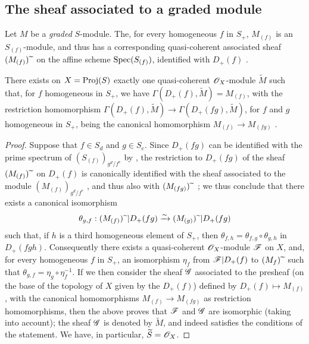 \subsection{The sheaf associated to a graded module}
\label{subsection:II.2.5}

\begin{env}[2.5.1]
\label{II.2.5.1}
Let $M$ be a \emph{graded} $S$-module.
The, for every homogeneous $f$ in $S_+$, $M_{(f)}$ is an $S_{(f)}$-module, and thus has a corresponding quasi-coherent associated sheaf $(M_{(f)}){\,\widetilde{\,}\,}$ on the affine scheme $\operatorname{Spec}(S_{(f)})$, identified with $D_+(f)$ .
\end{env}

\begin{proposition}[2.5.2]
\label{II.2.5.2}
There exists on $X=\operatorname{Proj}(S)$ exactly one quasi-coherent $\mathscr{O}_X$-module $\widetilde{M}$ such that, for $f$ homogeneous in $S_+$, we have $\Gamma(D_+(f),\widetilde{M})=M_{(f)}$, with the restriction homomorphism $\Gamma(D_+(f),\widetilde{M})\to\Gamma(D_+(fg),\widetilde{M})$, for $f$ and $g$ homogeneous in $S_+$, being the canonical homomorphism $M_{(f)}\to M_{(fg)}$ .
\end{proposition}

\begin{proof}
Suppose that $f\in S_d$ and $g\in S_e$.
Since $D_+(fg)$ can be identified with the prime spectrum of $(S_{(f)})_{g^d/f^e}$ by , the restriction to $D_+(fg)$ of the sheaf $(M_{(f)}){\,\widetilde{\,}\,}$ on $D_+(f)$ is canonically identified with the sheaf associated to the module $(M_{(f)})_{g^d/f^e}$ , and thus also with $(M_{(fg)}){\,\widetilde{\,}\,}$ ;
we thus conclude that there exists a canonical isomorphism
\[
  \theta_{g,f}: (M_{(f)}){\,\widetilde{\,}\,}|D_+(fg) \xrightarrow{\sim} (M_{(g)}){\,\widetilde{\,}\,}|D_+(fg)
\]
such that, if $h$ is a third homogeneous element of $S_+$, then $\theta_{f,h}=\theta_{f,g}\circ\theta_{g,h}$ in $D_+(fgh)$.
Consequently  there exists a quasi-coherent $\mathscr{O}_X$-module $\mathscr{F}$ on $X$, and, for every homogeneous $f$ in $S_+$, an isomorphism $\eta_f$ from $\mathscr{F}|D_+(f)$ to $(M_{f}){\,\widetilde{\,}\,}$ such that $\theta_{g,f}=\eta_g\circ\eta_f^{-1}$.
If we then consider the sheaf $\mathscr{G}$ associated to the presheaf (on the base of the topology of $X$ given by the $D_+(f)$) defined by $D_+(f)\mapsto M_{(f)}$, with the canonical homomorphisms $M_{(f)}\to M_{(fg)}$ as restriction homomorphisms, then the above proves that $\mathscr{F}$ and $\mathscr{G}$ are isomorphic (taking  into account);
the sheaf $\mathscr{G}$ is denoted by $\widetilde{M}$, and indeed satisfies the conditions of the statement.
We have, in particular, $\widetilde{S}=\mathscr{O}_X$.
\end{proof}

